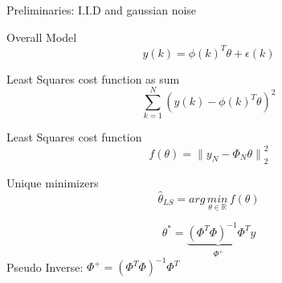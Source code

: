 
\begin{tcolorbox}[colback=red!5!white,colframe=red!75!black,title=Linear Least Squares Estimation]
Preliminaries: I.I.D and gaussian noise

Overall Model
\begin{equation*}
y(k)={ \phi (k) }^{ T }\theta +\epsilon (k)
\end{equation*}

Least Squares cost function as sum
\begin{equation*}
\sum _{ k=1 }^{ N }{{ (y(k)-{ \phi (k) }^{ T }\theta )}^{2  } } 
\end{equation*}

Least Squares cost function
\begin{equation*}
f(\theta )={ \parallel {y  }_{N  }-{ \Phi }_{ N }\theta\parallel }_{ 2 }^{2  }
\end{equation*}

Unique minimizers
\begin{equation*}
\hat{\theta}_{LS} =arg \, \underset{ \theta \in \mathbb{R} }{ min } \, f(\theta)
\end{equation*}

\begin{equation*}
{ \theta  }^{ * }=\underbrace { { ({ \Phi  }^{ T }\Phi ) }^{ -1 }{ \Phi  }^{ T } }_{ { \Phi  }^{ + } } y
\end{equation*}
Pseudo Inverse: \qquad $\Phi ^{ + }={({ \Phi  }^{ T }\Phi ) }^{ -1 }{ \Phi  }^{ T }$\\
\end{tcolorbox}

